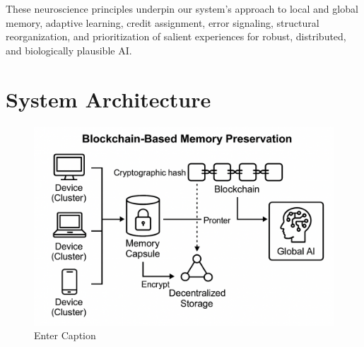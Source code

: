 \documentclass[11pt]{article}
\begin{document}
These neuroscience principles underpin our system’s approach to local and global memory, adaptive learning, credit assignment, error signaling, structural reorganization, and prioritization of salient experiences for robust, distributed, and biologically plausible AI.

\section{System Architecture}
\begin{figure}
    \centering
    \includegraphics[width=0.5\linewidth]{architecture_diagrams/6f6cd4fd-81a1-4ae3-be8c-6fd34920efe3.png}
    \caption{Enter Caption}
    \label{fig:enter-label}
\end{figure}
\end{document}

